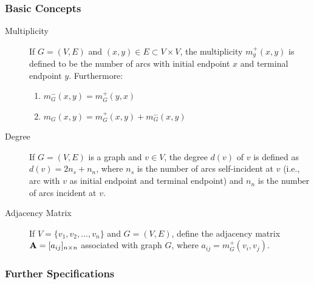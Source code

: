 \subsubsection{Basic Concepts \cite{berge1973}}
\begin{description}
	\item[Multiplicity] If $G=(V, E)$ and $(x, y) \in E \subset V\times V$, the multiplicity $m_g^+(x, y)$ is defined to be the number of arcs with initial endpoint $x$ and terminal endpoint $y$. Furthermore:
	\begin{enumerate}
		\item $m_G^-(x, y) = m_G^+(y, x)$
		\item $m_G(x, y) = m_G^+(x, y) + m_G^-(x, y)$
	\end{enumerate}

	\item[Degree] If $G=(V, E)$ is a graph and $v\in V$, the degree $d(v)$ of $v$ is defined as
	$d(v) = 2n_s  + n_n$, where $n_s$ is the number of arcs self-incident at $v$ \cite{may1972} (i.e., arc with $v$ as initial endpoint and terminal endpoint) and $n_n$ is the number of arcs incident at $v$.

	\item[Adjacency Matrix] If $V=\{v_1, v_2, \dots, v_n \}$ and $G=(V, E)$, define the adjacency matrix $\mathbf{A}=[a_{ij}]_{n\times n}$ associated with graph $G$, where $a_{ij} = m_G^+(v_i, v_j)$.
\end{description}

\subsubsection{Further Specifications}

